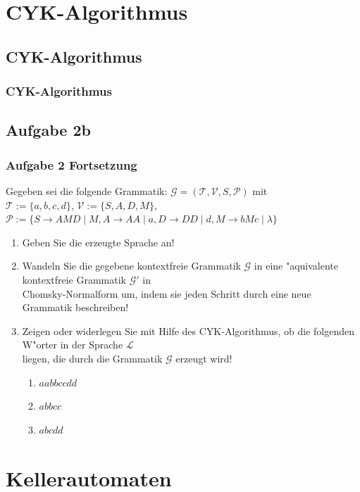 \section{CYK-Algorithmus}
\subsection{CYK-Algorithmus}
\begin{frame}
	\frametitle{CYK-Algorithmus}
\end{frame}

\subsection{Aufgabe 2b}
\begin{frame}
	\frametitle{Aufgabe 2 Fortsetzung}
	Gegeben sei die folgende Grammatik: $\mathcal{G} = (\mathcal{T},\mathcal{V},S,
	\mathcal{P})$ mit\\
	$\mathcal{T} := \{a,b,c,d\}$, $\mathcal{V} := \{S,A,D,M\}$, $\mathcal{P} := \{
	S \rightarrow AMD \; | \; M, A \rightarrow AA \; | \; a, D \rightarrow DD \; | \; d,
	M \rightarrow bMc \; | \; \lambda\}$
	\begin{enumerate}
		\item Geben Sie die erzeugte Sprache an!
		\item Wandeln Sie die gegebene kontextfreie Grammatik $\mathcal{G}$ in eine
		"aquivalente kontextfreie Grammatik $\mathcal{G}'$ in\\
		Chomsky-Normalform um, indem sie jeden Schritt durch eine neue Grammatik beschreiben!
		\item Zeigen oder widerlegen Sie mit Hilfe des CYK-Algorithmus, ob die folgenden
		W"orter in der Sprache $\mathcal{L}$\\
		liegen, die durch die Grammatik $\mathcal{G}$ erzeugt wird!
		\begin{enumerate}
			\item $aabbccdd$
			\item $abbcc$
			\item $abcdd$
		\end{enumerate}
	\end{enumerate}
\end{frame}

\section{Kellerautomaten}
